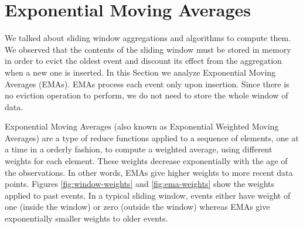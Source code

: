 \section{Exponential Moving Averages} \label{sec:emas}

We talked about sliding window aggregations and algorithms to compute them. We observed that the contents of the sliding window must be stored in memory in order to evict the oldest event and discount its effect from the aggregation when a new one is inserted. In this Section we analyze Exponential Moving Averages (EMAs). EMAs process each event only upon insertion. Since there is no eviction operation to perform, we do not need to store the whole window of data.

Exponential Moving Averages (also known as Exponential Weighted Moving Averages) \cite{EMA-Everett2011} \cite{EMA-Hunter} \cite{EMA-MarcusB} are a type of reduce functions applied to a sequence of elements, one at a time in a orderly fashion, to compute a weighted average, using different weights for each element. These weights decrease exponentially with the age of the observations. In other words, EMAs give higher weights to more recent data points. Figures \ref{fig:window-weights} and \ref{fig:ema-weights} show the weights applied to past events. In a typical sliding window, events either have weight of one (inside the window) or zero (outside the window) whereas EMAs give exponentially smaller weights to older events.

